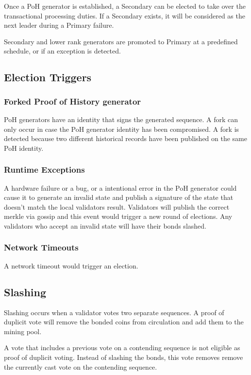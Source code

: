 \documentclass[12pt]{article}
\begin{document}
Once a PoH generator is established, a Secondary can be elected to take over the transactional processing duties. If a Secondary exists, it will be considered as the next leader during a Primary failure.

Secondary and lower rank generators are promoted to Primary at a predefined schedule, or if an exception is detected.
\subsection{Election Triggers}
\subsubsection{Forked Proof of History generator}

PoH generators have an identity that signs the generated sequence. A fork can only occur in case the PoH generator identity has been compromised. A fork is detected because two different historical records have been published on the same PoH identity.

\subsubsection{Runtime Exceptions}
A hardware failure or a bug, or a intentional error in the PoH generator could cause it to generate an invalid state and publish a signature of the state that doesn’t match the local validators result. Validators will publish the correct merkle via gossip and this event would trigger a new round of elections. Any validators who accept an invalid state will have their bonds slashed.

\subsubsection{Network Timeouts}

A network timeout would trigger an election.

\subsection{Slashing}
Slashing occurs when a validator votes two separate sequences. A proof of duplicit vote will remove the bonded coins from circulation and add them to the mining pool.

A vote that includes a previous vote on a contending sequence is not eligible as proof of duplicit voting. Instead of slashing the bonds, this vote removes remove the currently cast vote on the contending sequence.
\end{document}
